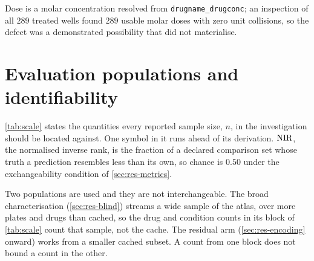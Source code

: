\begin{figure}[htbp]
\begin{lrbox}{\tvfb}%
%
\end{lrbox}

\end{figure}


Dose is a molar concentration resolved from \texttt{drugname\_drugconc}; an inspection of all $289$ treated wells found $289$ usable molar doses
with zero unit collisions, so the defect was a demonstrated possibility that did
not materialise. 


\section{Evaluation populations and identifiability}

\cref{tab:scale} states the quantities every reported sample size, $n$, in the investigation should be
located against. One symbol in it runs ahead of its
derivation. $\textrm{NIR}$, the normalised inverse rank, is the
fraction of a declared comparison set whose truth a prediction resembles less
than its own, so chance is $0.50$ under the exchangeability condition of
\cref{sec:res-metrics}.

\begin{scopelimit}
Two populations are used and they are not interchangeable. The broad
characterisation (\cref{sec:res-blind}) streams a wide sample of the atlas, over
more plates and drugs than cached, so the drug and condition counts in its block
of \cref{tab:scale} count that sample, not the cache. The residual arm
(\cref{sec:res-encoding} onward) works from a smaller cached subset. A count
from one block does not bound a count in the other.
\end{scopelimit}

